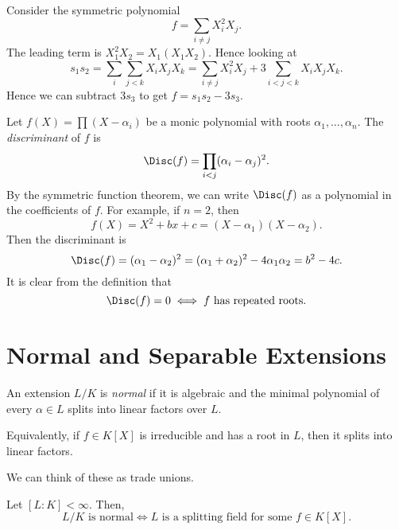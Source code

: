 \documentclass[12pt]{article}
\begin{document}
\begin{exbox}
	Consider the symmetric polynomial
	\[
	f = \sum_{i \neq j} X_i^2 X_j.
	\]
	The leading term is $X_1^2X_2=X_1(X_1X_2)$. Hence looking at
	\[
	s_1s_2 = \sum_i \sum_{j<k} X_i X_j X_k = \sum_{i\neq j} X_i^2X_j + 3\sum_{i<j<k} X_iX_jX_k.
	\]
	Hence we can subtract $3s_3$ to get $f = s_1s_2 - 3s_3$.
\end{exbox}

\begin{exbox}
	Let $f(X) = \prod (X - \alpha_i)$ be a monic polynomial with roots $\alpha_1, \ldots, \alpha_n$. The \emph{discriminant} of $f$ is
	\[
	\Disc(f) = \prod_{i<j}(\alpha_i - \alpha_j)^2.
	\]
	By the symmetric function theorem, we can write $\Disc(f)$ as a polynomial in the coefficients of $f$. For example, if $n = 2$, then
	\[
	f(X) = X^2 + bx + c = (X-\alpha_1)(X-\alpha_2).
	\]
	Then the discriminant is
	\[
	\Disc(f) = (\alpha_1-\alpha_2)^2 = (\alpha_1+\alpha_2)^2 - 4\alpha_1\alpha_2 = b^2 - 4c.
	\]
	It is clear from the definition that
	\[
		\Disc(f) = 0 \iff f \text{ has repeated roots}.
	\]
\end{exbox}

\newpage

\section{Normal and Separable Extensions}
\label{sec:norm_sep_ext}

\begin{definition}
	An extension $L/K$ is \emph{normal} if it is algebraic and the minimal polynomial of every $\alpha \in L$ splits into linear factors over $L$.

	Equivalently, if $f \in K[X]$ is irreducible and has a root in $L$, then it splits into linear factors.
\end{definition}

We can think of these as trade unions.

\begin{theorem}\label{thm:norm_split}
	Let $[L:K] < \infty$. Then,
	\[
		L/K \text{ is normal} \iff L\text{ is a splitting field for some } f \in K[X].
	\]
\end{theorem}
\end{document}
